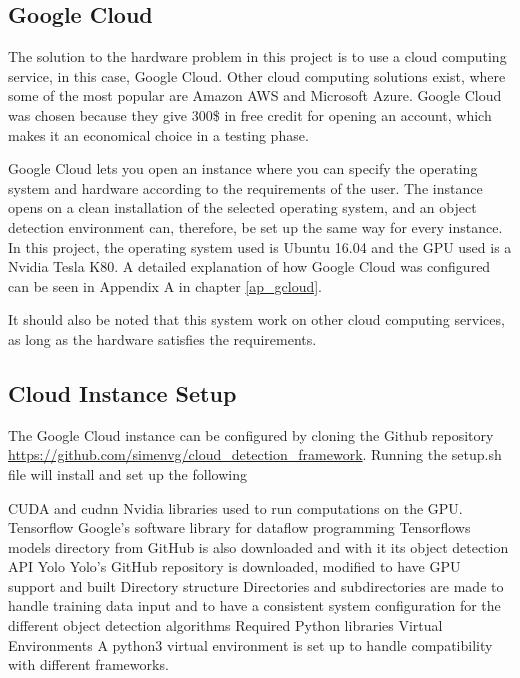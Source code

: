 \subsection{Google Cloud}
The solution to the hardware problem in this project is to use a cloud computing service, in this case, Google Cloud. Other cloud computing solutions exist, where some of the most popular are Amazon AWS and Microsoft Azure. Google Cloud was chosen because they give 300\$ in free credit for opening an account, which makes it an economical choice in a testing phase.

\vspace{3mm}

Google Cloud lets you open an instance where you can specify the operating system and hardware according to the requirements of the user. The instance opens on a clean installation of the selected operating system, and an object detection environment can, therefore, be set up the same way for every instance. In this project, the operating system used is Ubuntu 16.04 and the GPU used is a Nvidia Tesla K80. A detailed explanation of how Google Cloud was configured can be seen in Appendix A in chapter \ref{ap_gcloud}.

\vspace{3mm}

It should also be noted that this system work on other cloud computing services, as long as the hardware satisfies the requirements. 

\subsection{Cloud Instance Setup}
The Google Cloud instance can be configured by cloning the Github repository \url{https://github.com/simenvg/cloud_detection_framework}. Running the setup.sh file will install and set up the following 

\begin{outline}
    \1 CUDA and cudnn
       \2 Nvidia libraries used to run computations on the GPU. 
    \1 Tensorflow
       \2 Google's software library for dataflow programming
       \2 Tensorflows models directory from GitHub is also downloaded and with it its object detection API
    \1 Yolo
       \2 Yolo's GitHub repository is downloaded, modified to have GPU support and built
    \1 Directory structure
       \2 Directories and subdirectories are made to handle training data input and to have a consistent system configuration for the different object detection algorithms
    \1 Required Python libraries
    \1 Virtual Environments
       \2 A python3 virtual environment is set up to handle compatibility with different frameworks.
\end{outline}



